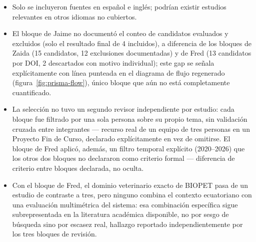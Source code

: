 \begin{itemize}[nosep]
  \item Solo se incluyeron fuentes en espa\~nol e ingl\'es; podr\'ian existir
    estudios relevantes en otros idiomas no cubiertos.
  \item El bloque de Jaime no document\'o el conteo de candidatos evaluados
    y excluidos (solo el resultado final de 4 incluidos), a diferencia de
    los bloques de Zaida (15 candidatos, 12 exclusiones documentadas) y de
    Fred (13 candidatos por DOI, 2 descartados con motivo individual);
    este gap se se\~nala expl\'icitamente con l\'inea punteada en el
    diagrama de flujo regenerado (figura~\ref{fig:prisma-flow}), \'unico
    bloque que a\'un no est\'a completamente cuantificado.
  \item La selecci\'on no tuvo un segundo revisor independiente por
    estudio: cada bloque fue filtrado por una sola persona sobre su propio
    tema, sin validaci\'on cruzada entre integrantes --- recurso real de un
    equipo de tres personas en un Proyecto Fin de Curso, declarado
    expl\'icitamente en vez de omitirse. El bloque de Fred aplic\'o,
    adem\'as, un filtro temporal expl\'icito (2020--2026) que los otros dos
    bloques no declararon como criterio formal --- diferencia de criterio
    entre bloques declarada, no oculta.
  \item Con el bloque de Fred, el dominio veterinario exacto de BIOPET pasa
    de un estudio de contraste a tres, pero ninguno combina el contexto
    ecuatoriano con una evaluaci\'on multim\'etrica del sistema: esa
    combinaci\'on espec\'ifica sigue subrepresentada en la literatura
    acad\'emica disponible, no por sesgo de b\'usqueda sino por escasez
    real, hallazgo reportado independientemente por los tres bloques de
    revisi\'on.
\end{itemize}
